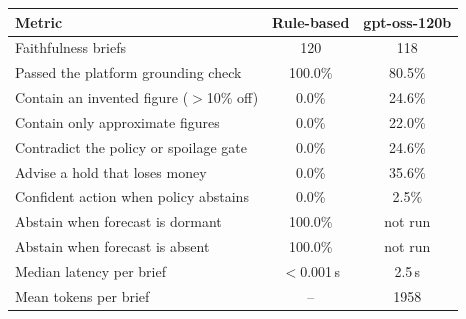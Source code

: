 \begin{tabular}{lcc}
\toprule
Metric & Rule-based & gpt-oss-120b\\
\midrule
Faithfulness briefs & 120 & 118\\
Passed the platform grounding check & 100.0\% & 80.5\%\\
Contain an invented figure ($>$10\% off) & 0.0\% & 24.6\%\\
Contain only approximate figures & 0.0\% & 22.0\%\\
Contradict the policy or spoilage gate & 0.0\% & 24.6\%\\
Advise a hold that loses money & 0.0\% & 35.6\%\\
Confident action when policy abstains & 0.0\% & 2.5\%\\
Abstain when forecast is dormant & 100.0\% & not run\\
Abstain when forecast is absent & 100.0\% & not run\\
Median latency per brief & $<$0.001\,s & 2.5\,s\\
Mean tokens per brief & -- & 1958\\
\bottomrule
\end{tabular}
